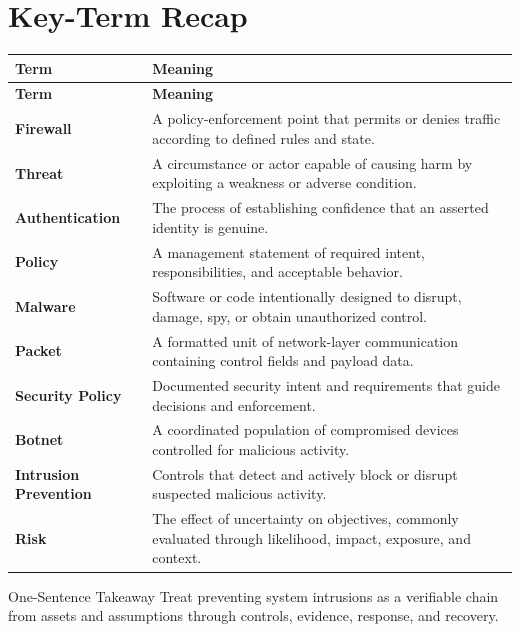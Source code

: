 \documentclass[11pt,letterpaper]{article}
\begin{document}
\section*{Key-Term Recap}
\begin{longtable}{>{\raggedright\arraybackslash}p{}>{\raggedright\arraybackslash}p{}}
\toprule\rowcolor{Navy}\color{white}\textbf{Term} & \color{white}\textbf{Meaning}\\\midrule
\endfirsthead
\toprule\rowcolor{Navy}\color{white}\textbf{Term} & \color{white}\textbf{Meaning}\\\midrule
\endhead
\textbf{Firewall} & A policy-enforcement point that permits or denies traffic according to defined rules and state. \\\midrule
\textbf{Threat} & A circumstance or actor capable of causing harm by exploiting a weakness or adverse condition. \\\midrule
\textbf{Authentication} & The process of establishing confidence that an asserted identity is genuine. \\\midrule
\textbf{Policy} & A management statement of required intent, responsibilities, and acceptable behavior. \\\midrule
\textbf{Malware} & Software or code intentionally designed to disrupt, damage, spy, or obtain unauthorized control. \\\midrule
\textbf{Packet} & A formatted unit of network-layer communication containing control fields and payload data. \\\midrule
\textbf{Security Policy} & Documented security intent and requirements that guide decisions and enforcement. \\\midrule
\textbf{Botnet} & A coordinated population of compromised devices controlled for malicious activity. \\\midrule
\textbf{Intrusion Prevention} & Controls that detect and actively block or disrupt suspected malicious activity. \\\midrule
\textbf{Risk} & The effect of uncertainty on objectives, commonly evaluated through likelihood, impact, exposure, and context. \\\midrule
\bottomrule
\end{longtable}
\begin{CornellExamBox}{One-Sentence Takeaway}
Treat preventing system intrusions as a verifiable chain from assets and assumptions through controls, evidence, response, and recovery.
\end{CornellExamBox}
\end{document}
